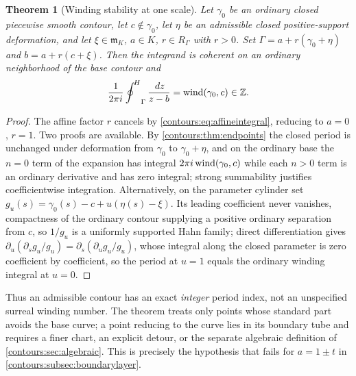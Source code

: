 \documentclass[11pt,letterpaper]{article}
\newtheorem{theorem}{Theorem}[section]
\theoremstyle{definition}
\theoremstyle{remark}
\newcommand{\m}{\mathfrak m}\newcommand{\st}{\operatorname{st}}
\newcommand{\HCoint}{\mathop{\oint^{\!H}}\nolimits}
\numberwithin{equation}{section}
\begin{document}
\begin{theorem}[Winding stability at one scale]\label{contours:thm:winding}
Let $\gamma_0$ be an ordinary closed piecewise smooth contour, let $c\notin\gamma_0$,
let $\eta$ be an admissible closed positive-support deformation, and let
$\xi\in\m_K$, $a\in K$, $r\in R_\Gamma$ with $r>0$. Set
$\Gamma=a+r(\gamma_0+\eta)$ and $b=a+r(c+\xi)$. Then the integrand is coherent on an
ordinary neighborhood of the base contour and
\begin{equation}\label{contours:eq:winding}
  \frac1{2\pi i}\HCoint_\Gamma\frac{\dd z}{z-b}=\wind(\gamma_0,c)\in\Z .
\end{equation}
\end{theorem}
\begin{proof}
The affine factor $r$ cancels by \eqref{contours:eq:affineintegral}, reducing to
$a=0$, $r=1$. Two proofs are available. By \cref{contours:thm:endpoints} the closed
period is unchanged under deformation from $\gamma_0$ to $\gamma_0+\eta$, and on the
ordinary base the $n=0$ term of the expansion has integral $2\pi i\operatorname{wind}(\gamma_0,c)$
while each $n>0$ term is an ordinary derivative and has zero integral; strong
summability justifies coefficientwise integration. Alternatively, on the parameter
cylinder set $g_u(s)=\gamma_0(s)-c+u(\eta(s)-\xi)$. Its leading coefficient never
vanishes, compactness of the ordinary contour supplying a positive ordinary
separation from $c$, so $1/g_u$ is a uniformly supported Hahn family; direct
differentiation gives
$\partial_u(\partial_sg_u/g_u)=\partial_s(\partial_ug_u/g_u)$, whose integral along
the closed parameter is zero coefficient by coefficient, so the period at $u=1$
equals the ordinary winding integral at $u=0$.
\end{proof}

Thus an admissible contour has an exact \emph{integer} period index, not an
unspecified surreal winding number. The theorem treats only points whose standard
part avoids the base curve; a point reducing to the curve lies in its boundary tube
and requires a finer chart, an explicit detour, or the separate algebraic definition
of \cref{contours:sec:algebraic}. This is precisely the hypothesis that fails for
$a=1\pm t$ in \cref{contours:subsec:boundarylayer}.
\end{document}
